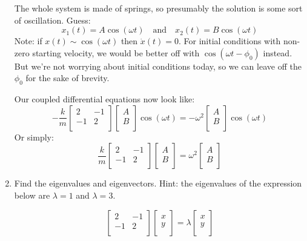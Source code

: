 \documentclass[12pt]{article}
\newcommand{\purple}[1]{{\color{purple} #1}}
\begin{document}
\begin{enumerate}
\purple{
The whole system is made of springs, so presumably the solution is some sort of oscillation. Guess:
$$
x_1(t) = A\cos \left( \omega t \right)
\quad\text{and}\quad
x_2(t) = B\cos \left( \omega t \right)
$$
Note: if $x(t) \sim \cos \left( \omega t \right)$ then $\dot{x}(t) = 0$. For initial conditions with non-zero starting velocity, we would be better off with $\cos\left( \omega t - \phi_0 \right)$ instead. But we're not worrying about initial conditions today, so we can leave off the $\phi_0$ for the sake of brevity.

Our coupled differential equations now look like:
$$
-\frac{k}{m}
\left[
{\begin{array}{cc}
   2 & -1\\
   -1 & 2\\
  \end{array} }
\right]
\left[
{\begin{array}{c}
   A\\
   B\\
  \end{array} }
\right]
\cos \left( \omega t \right)
= 
- \omega^2
\left[
{\begin{array}{c}
   A\\
   B\\
  \end{array} }
\right]
\cos \left( \omega t \right)
$$
Or simply:
$$
\frac{k}{m}
\left[
{\begin{array}{cc}
   2 & -1\\
   -1 & 2\\
  \end{array} }
\right]
\left[
{\begin{array}{c}
   A\\
   B\\
  \end{array} }
\right]
= 
\omega^2
\left[
{\begin{array}{c}
   A\\
   B\\
  \end{array} }
\right]
$$
}
\item Find the eigenvalues and eigenvectors. Hint: the eigenvalues of the expression below
are $\lambda=1$ and $\lambda = 3$.

$$
\left[
{\begin{array}{cc}
   2 & -1\\
   -1 & 2\\
  \end{array} }
\right]
\left[
{\begin{array}{c}
   x\\
   y\\
  \end{array} }
\right]
 = 
 \lambda\left[
{\begin{array}{c}
   x\\
   y\\
  \end{array} }
\right]
$$


\end{enumerate}
\end{document}
